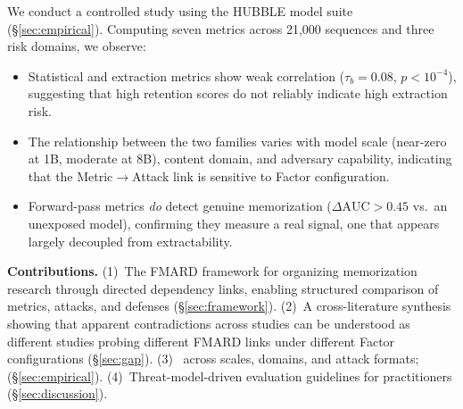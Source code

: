 \documentclass[11pt]{article}
\begin{document}
We conduct a controlled study using the HUBBLE model
suite~\citep{wei2025hubble} (\S\ref{sec:empirical}).
Computing seven metrics across 21{,}000 sequences and three risk domains, we
observe:
\begin{itemize}[nosep]
  \item Statistical and extraction metrics show weak correlation ($\tau_b = 0.08$,
    $p < 10^{-4}$), suggesting that high retention scores do not reliably
    indicate high extraction risk.
  \item The relationship between the two families varies with model scale
    (near-zero at 1B, moderate at 8B), content domain, and adversary
    capability, indicating that the Metric$\to$Attack link is sensitive to
    Factor configuration.
  \item Forward-pass metrics \emph{do} detect genuine memorization
    ($\Delta\text{AUC} > 0.45$ vs.\ an unexposed model), confirming they
    measure a real signal, one that appears largely decoupled from
    extractability.
\end{itemize}

\noindent\textbf{Contributions.}
(1)~The FMARD framework for organizing memorization research through directed
dependency links, enabling structured comparison of metrics, attacks, and
defenses (\S\ref{sec:framework}).
(2)~A cross-literature synthesis showing that apparent contradictions across
studies can be understood as different studies probing different FMARD links
under different Factor configurations (\S\ref{sec:gap}).
(3)~
across scales, domains, and attack formats;
(\S\ref{sec:empirical}).
(4)~Threat-model-driven evaluation guidelines for practitioners
(\S\ref{sec:discussion}).
\end{document}
